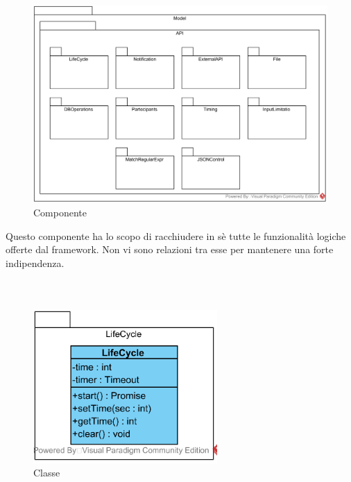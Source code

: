 %

\paragraph[::API]{\class}\mbox{}\\ \label{\class}
\begin{figure}[H]
	\centering
	\includegraphics[width=15cm]{./diagrammi/framework/model/api.png}
	\caption{Componente \class}
\end{figure}
Questo componente ha lo scopo di racchiudere in sè tutte le funzionalità logiche offerte dal framework. Non vi sono relazioni tra esse per mantenere una forte indipendenza.

\subparagraph[::LifeCycle::LifeCycle]{\class}\mbox{}\\ \label{\class}
\begin{figure}[H]
	\centering
	\includegraphics[width=7cm]{./diagrammi/framework/model/api/lifecycle.png}
	\caption{Classe \class}
\end{figure}

